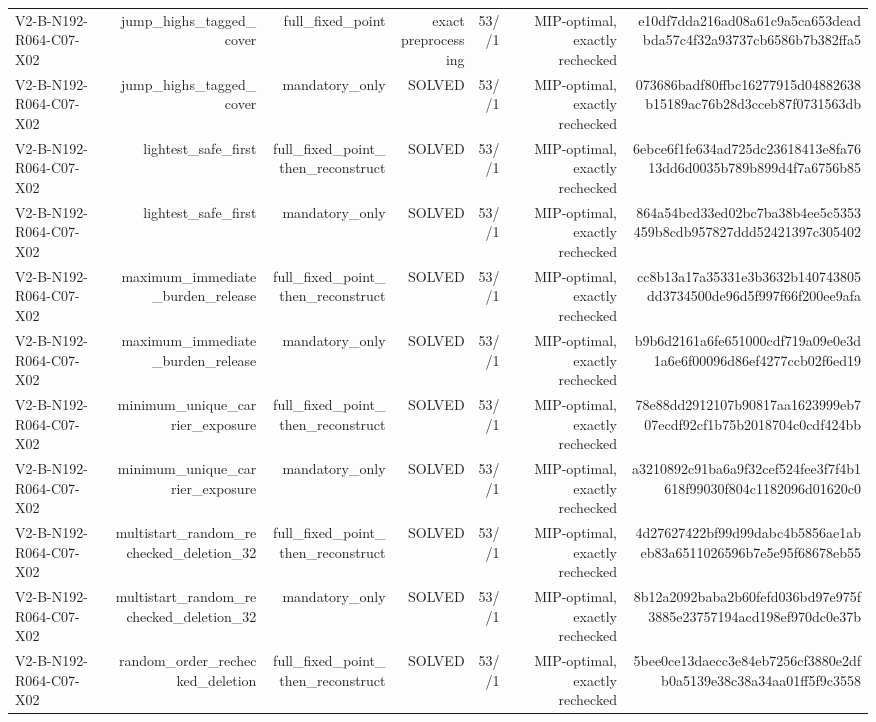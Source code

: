 {\begin{longtable}{lrrrrrr}
V2-B-N192-R064-C07-X02 & jump\_highs\_tagged\_cover & full\_fixed\_point & exact preprocessing & 53//1 & MIP-optimal, exactly rechecked & e10df7dda216ad08a61c9a5ca653deadbda57c4f32a93737cb6586b7b382ffa5 \\
V2-B-N192-R064-C07-X02 & jump\_highs\_tagged\_cover & mandatory\_only & SOLVED & 53//1 & MIP-optimal, exactly rechecked & 073686badf80ffbc16277915d04882638b15189ac76b28d3cceb87f0731563db \\
V2-B-N192-R064-C07-X02 & lightest\_safe\_first & full\_fixed\_point\_then\_reconstruct & SOLVED & 53//1 & MIP-optimal, exactly rechecked & 6ebce6f1fe634ad725dc23618413e8fa7613dd6d0035b789b899d4f7a6756b85 \\
V2-B-N192-R064-C07-X02 & lightest\_safe\_first & mandatory\_only & SOLVED & 53//1 & MIP-optimal, exactly rechecked & 864a54bcd33ed02bc7ba38b4ee5c5353459b8cdb957827ddd52421397c305402 \\
V2-B-N192-R064-C07-X02 & maximum\_immediate\_burden\_release & full\_fixed\_point\_then\_reconstruct & SOLVED & 53//1 & MIP-optimal, exactly rechecked & cc8b13a17a35331e3b3632b140743805dd3734500de96d5f997f66f200ee9afa \\
V2-B-N192-R064-C07-X02 & maximum\_immediate\_burden\_release & mandatory\_only & SOLVED & 53//1 & MIP-optimal, exactly rechecked & b9b6d2161a6fe651000cdf719a09e0e3d1a6e6f00096d86ef4277ccb02f6ed19 \\
V2-B-N192-R064-C07-X02 & minimum\_unique\_carrier\_exposure & full\_fixed\_point\_then\_reconstruct & SOLVED & 53//1 & MIP-optimal, exactly rechecked & 78e88dd2912107b90817aa1623999eb707ecdf92cf1b75b2018704c0cdf424bb \\
V2-B-N192-R064-C07-X02 & minimum\_unique\_carrier\_exposure & mandatory\_only & SOLVED & 53//1 & MIP-optimal, exactly rechecked & a3210892c91ba6a9f32cef524fee3f7f4b1618f99030f804c1182096d01620c0 \\
V2-B-N192-R064-C07-X02 & multistart\_random\_rechecked\_deletion\_32 & full\_fixed\_point\_then\_reconstruct & SOLVED & 53//1 & MIP-optimal, exactly rechecked & 4d27627422bf99d99dabc4b5856ae1abeb83a6511026596b7e5e95f68678eb55 \\
V2-B-N192-R064-C07-X02 & multistart\_random\_rechecked\_deletion\_32 & mandatory\_only & SOLVED & 53//1 & MIP-optimal, exactly rechecked & 8b12a2092baba2b60fefd036bd97e975f3885e23757194acd198ef970dc0e37b \\
V2-B-N192-R064-C07-X02 & random\_order\_rechecked\_deletion & full\_fixed\_point\_then\_reconstruct & SOLVED & 53//1 & MIP-optimal, exactly rechecked & 5bee0ce13daecc3e84eb7256cf3880e2dfb0a5139e38c38a34aa01ff5f9c3558 \\

\end{longtable}}
